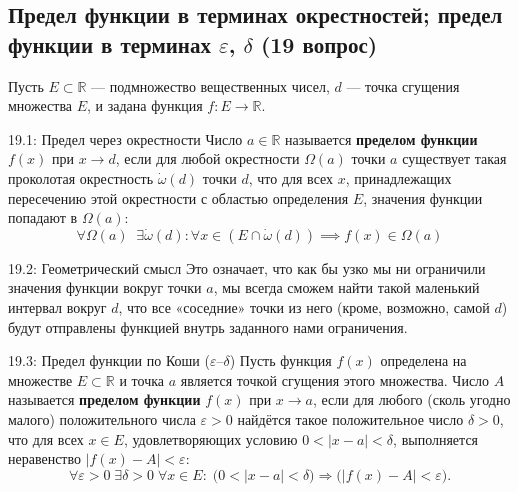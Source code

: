 \documentclass[a4paper,12pt]{article}
\begin{document}
	\subsection{Предел функции в терминах окрестностей; предел функции в терминах $\varepsilon$, $\delta$ (19 вопрос)}
	
	Пусть $E \subset \mathbb{R}$ — подмножество вещественных чисел, $d$ — точка сгущения множества $E$, и задана функция $f \colon E \to \mathbb{R}$.
	
	\begin{definitionbox}{19.1: Предел через окрестности}
		Число $a \in \mathbb{R}$ называется \textbf{пределом функции} $f(x)$ при $x \to d$, если для любой окрестности $\Omega(a)$ точки $a$ существует такая проколотая окрестность $\dot{\omega}(d)$ точки $d$, что для всех $x$, принадлежащих пересечению этой окрестности с областью определения $E$, значения функции попадают в $\Omega(a)$:
		\[
		\forall \Omega(a) \;\; \exists \dot{\omega}(d) \colon \forall x \in (E \cap \dot{\omega}(d)) \implies f(x) \in \Omega(a)
		\]
	\end{definitionbox}
	
	\begin{notebook}{19.2: Геометрический смысл}
		Это означает, что как бы узко мы ни ограничили значения функции вокруг точки $a$, мы всегда сможем найти такой маленький интервал вокруг $d$, что все «соседние» точки из него (кроме, возможно, самой $d$) будут отправлены функцией внутрь заданного нами ограничения.
	\end{notebook}
	
	\begin{definitionbox}{19.3: Предел функции по Коши ($\varepsilon$–$\delta$)}
		Пусть функция $f(x)$ определена на множестве $E \subset \mathbb{R}$ и точка $a$ является точкой сгущения этого множества. Число $A$ называется \textbf{пределом функции} $f(x)$ при $x \to a$, если для любого (сколь угодно малого) положительного числа $\varepsilon > 0$ найдётся такое положительное число $\delta > 0$, что для всех $x \in E$, удовлетворяющих условию $0 < |x - a| < \delta$, выполняется неравенство $|f(x) - A| < \varepsilon$:
		\[
		\forall \varepsilon > 0 \; \exists \delta > 0 \; \forall x \in E: \; \big( 0 < |x - a| < \delta \big) \Rightarrow \big( |f(x) - A| < \varepsilon \big).
		\]
	\end{definitionbox}
	
\end{document}
